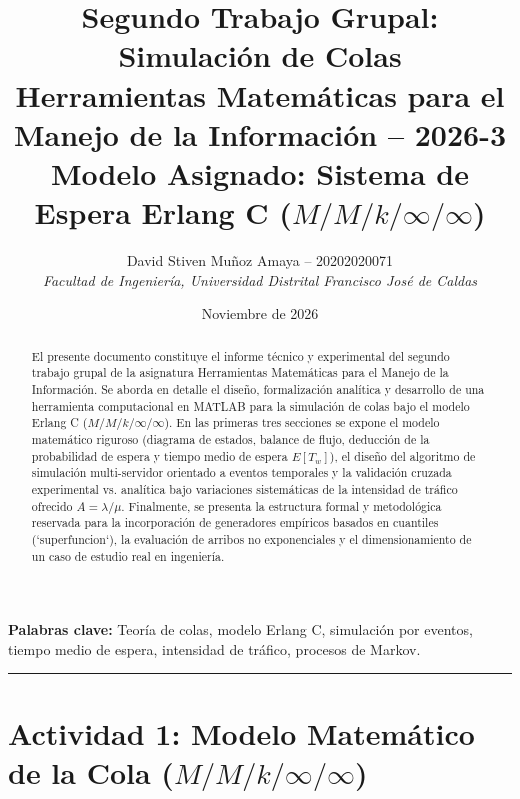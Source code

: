 \documentclass[11pt, a4paper]{article}
\title{\textbf{Segundo Trabajo Grupal: Simulación de Colas}\\[0.3em]
\large Herramientas Matemáticas para el Manejo de la Información -- 2026-3\\[0.2em]
\normalsize Modelo Asignado: Sistema de Espera Erlang C ($M/M/k/\infty/\infty$)}
\author{David Stiven Muñoz Amaya -- 20202020071\\[0.2em]
\textit{Facultad de Ingeniería, Universidad Distrital Francisco José de Caldas}}
\date{Noviembre de 2026}
\begin{document}
\maketitle

\begin{abstract}
El presente documento constituye el informe técnico y experimental del segundo trabajo grupal de la asignatura Herramientas Matemáticas para el Manejo de la Información. Se aborda en detalle el diseño, formalización analítica y desarrollo de una herramienta computacional en MATLAB para la simulación de colas bajo el modelo Erlang C ($M/M/k/\infty/\infty$). En las primeras tres secciones se expone el modelo matemático riguroso (diagrama de estados, balance de flujo, deducción de la probabilidad de espera y tiempo medio de espera $E[T_w]$), el diseño del algoritmo de simulación multi-servidor orientado a eventos temporales y la validación cruzada experimental vs. analítica bajo variaciones sistemáticas de la intensidad de tráfico ofrecido $A = \lambda/\mu$. Finalmente, se presenta la estructura formal y metodológica reservada para la incorporación de generadores empíricos basados en cuantiles (`superfuncion`), la evaluación de arribos no exponenciales y el dimensionamiento de un caso de estudio real en ingeniería.
\end{abstract}

\vspace{0.5em}
\noindent\textbf{Palabras clave:} Teoría de colas, modelo Erlang C, simulación por eventos, tiempo medio de espera, intensidad de tráfico, procesos de Markov.

\vspace{1em}
\hrule
\vspace{1em}

\section{Actividad 1: Modelo Matemático de la Cola ($M/M/k/\infty/\infty$)}
\end{document}
